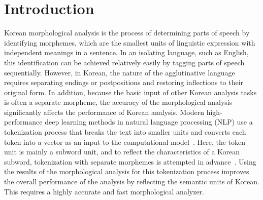 \documentclass[AMS,STIX2COL]{WileyNJD-v2}
\begin{document}
    \section{Introduction}\label{sec:intro}

    Korean morphological analysis is the process of determining parts of speech by identifying morphemes, which are the smallest units of linguistic expression with independent meanings in a sentence.
    In an isolating language, such as English, this identification can be achieved relatively easily by tagging parts of speech sequentially.
    However, in Korean, the nature of the agglutinative language requires separating endings or postpositions and restoring inflections to their original form.
    In addition, because the basic input of other Korean analysis tasks is often a separate morpheme, the accuracy of the morphological analysis significantly affects the performance of Korean analysis.
    Modern high-performance deep learning methods in natural language processing (NLP) use a tokenization process that breaks the text into smaller units and converts each token into a vector as an input to the computational model~\cite{Mikolov2013}.
    Here, the token unit is mainly a subword unit, and to reflect the characteristics of a Korean subword, tokenization with separate morphemes is attempted in advance~\cite{SongHJ2021}.
    Using the results of the morphological analysis for this tokenization process improves the overall performance of the analysis by reflecting the semantic units of Korean.
    This requires a highly accurate and fast morphological analyzer.
\end{document}
